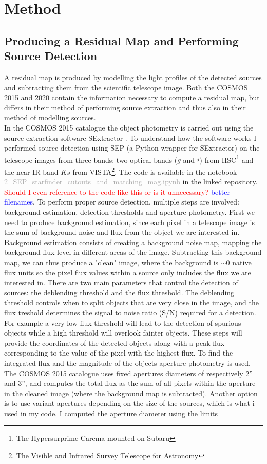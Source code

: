 \section{Method}
\subsection{Producing a Residual Map and Performing Source Detection}
A residual map is produced by modelling the light profiles of the detected sources and subtracting them from the scientific telescope image. Both the COSMOS 2015 and 2020 contain the information necessary to compute a residual map, but differs in their method of performing source extraction and thus also in their method of modelling sources. \\

In the COSMOS 2015 catalogue the object photometry is carried out using the source extraction software SExtractor \cite{SExtractor_1996}. To understand how the software works I performed source detection using SEP \cite{SEP_2018} (a Python wrapper for SExtractor) on the telescope images from three bands: two optical bands ($g$ and $i$) from HSC\footnote{The Hypersurprime Carema mounted on Subaru} and the near-IR band $Ks$ from VISTA\footnote{The Visible and Infrared Survey Telescope for Astronomy}. The code is available in the notebook \textcolor{darkgray}{2\_SEP\_starfinder\_cutouts\_and\_matching\_mag.ipynb} in the linked repository. \textcolor{red}{Should I even reference to the code like this or is it unnecessary?} \textcolor{blue}{better filenames}. To perform proper source detection, multiple steps are involved: background estimation, detection thresholds and aperture photometry. First we need to produce background estimation, since each pixel in a telescope image is the sum of background noise and flux from the object we are interested in. Background estimation consists of creating a background noise map, mapping the background flux level in different areas of the image. Subtracting this background map, we can thus produce a "clean" image, where the background is $\sim 0$ native flux units so the pixel flux values within a source only includes the flux we are interested in. There are two main parameters that control the detection of sources: the deblending threshold and the flux threshold. The deblending threshold controls when to split objects that are very close in the image, and the flux treshold determines the signal to noise ratio (S/N) required for a detection. For example a very low flux threshold will lead to the detection of spurious objects while a high threshold will overlook fainter objects. These steps will provide the coordinates of the detected objects along with a peak flux corresponding  to the value of the pixel with the highest flux. To find the integrated flux and the magnitude of the objects aperture photometry is used. The COSMOS 2015 catalogue uses fixed apertures diameters of respectively 2'' and 3'', and computes the total flux as the sum of all pixels within the aperture in the cleaned image (where the background map is subtracted). Another option is to use variant apertures depending on the size of the sources, which is what i used in my code. I computed the aperture diameter using the limits 